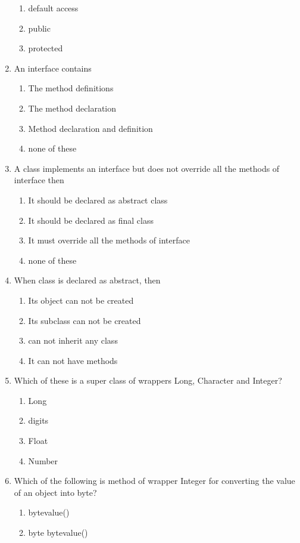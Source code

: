 \documentclass[11pt,a4paper]{article}
\begin{document}
\begin{enumerate}
\begin{enumerate}
	\item default access
	\item public
	\item protected
    \end{enumerate}
    \item An interface contains
    \begin{enumerate}
	\item The method definitions
	\item The method declaration
   	\item Method declaration and definition
	\item none of these
    \end{enumerate}
    \item A class implements an interface but does not override all the methods of interface then
    \begin{enumerate}
    	\item It should be declared as abstract class
	\item It should be declared as final class
	\item It must override all the methods of interface
	\item none of these
    \end{enumerate}
    \item When class is declared as abstract, then
    \begin{enumerate}
    	\item Its object can not be created
	\item Its subclass can not be created
	\item can not inherit any class
	\item It can not have methods
    \end{enumerate}
\item Which of these is a super class of wrappers Long, Character and Integer?
     \begin{enumerate}
         \item Long
         \item digits
         \item Float
         \item Number
     \end{enumerate}
 \item Which of the following is method of wrapper Integer for converting the value of an object into byte?
     \begin{enumerate}
         \item bytevalue()
         \item byte bytevalue()

\end{enumerate}
\end{enumerate}
\end{document}
